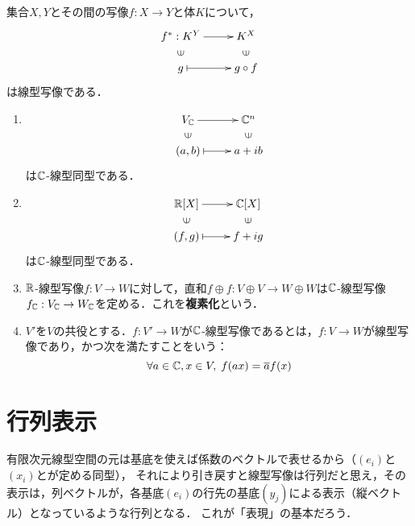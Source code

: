 \documentclass[uplatex, 12pt, dvipdfmx]{jsreport}
\begin{document}
\begin{example}[hom関手]\label{example-linear-hom-functor}
    集合$X,Y$とその間の写像$f:X\to Y$と体$K$について，
    \[\xymatrix@R-2pc{
        f^*:K^Y\ar[r]&K^X\\
        \rotatebox[origin=c]{90}{$\in$}&\rotatebox[origin=c]{90}{$\in$}\\
        g\ar@{|->}[r]&g\circ f
    }\]
    は線型写像である．
\end{example}

\begin{example}[複素化]\mbox{}
    \begin{enumerate}
        \item \[\xymatrix@R-2pc{
        V_\C\ar[r]&\C^n\\
        \rotatebox[origin=c]{90}{$\in$}&\rotatebox[origin=c]{90}{$\in$}\\
        (a,b)\ar@{|->}[r]&a+ib
    }\]
    は$\mathbb{C}$-線型同型である．
    \item \[\xymatrix@R-2pc{
        \R[X]\ar[r]&\C[X]\\
        \rotatebox[origin=c]{90}{$\in$}&\rotatebox[origin=c]{90}{$\in$}\\
        (f,g)\ar@{|->}[r]&f+ig
    }\]
    は$\mathbb{C}$-線型同型である．
    \item $\mathbb{R}$-線型写像$f:V\to W$に対して，直和$f\oplus f:V\oplus V\to W\oplus W$は$\mathbb{C}$-線型写像$f_{\mathbb{C}}:V_{\mathbb{C}}\to W_{\mathbb{C}}$を定める．これを\textbf{複素化}という．
    \item $V'$を$V$の共役とする．$f:V'\to W$が$\mathbb{C}$-線型写像であるとは，$f:V\to W$が線型写像であり，かつ次を満たすことをいう：
    \[ \forall a\in\mathbb{C},x\in V,\; f(ax)=\overline{a}f(x) \]
    \end{enumerate}
\end{example}

\section{行列表示}

\begin{screen}
    有限次元線型空間の元は基底を使えば係数のベクトルで表せるから（$(e_i)$と$(x_i)$とが定める同型），
    それにより引き戻すと線型写像は行列だと思え，その表示は，列ベクトルが，各基底$(e_i)$の行先の基底$(y_j)$による表示（縦ベクトル）となっているような行列となる．
    これが「表現」の基本だろう．
\end{screen}

\vspace{1mm}
\end{document}
